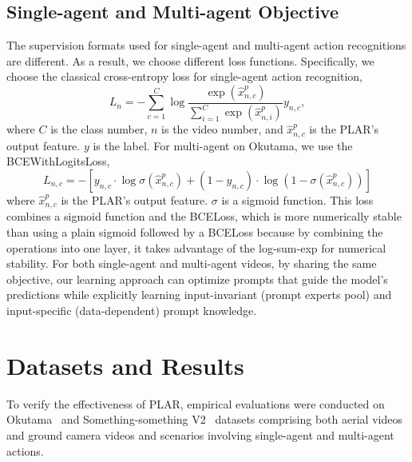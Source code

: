 \documentclass[letterpaper, 10 pt, conference]{ieeeconf}
\begin{document}
\subsection{Single-agent and Multi-agent Objective}
 The supervision formats used for single-agent and multi-agent action recognitions are different. As a result, we choose different loss functions. Specifically, we choose the classical cross-entropy loss for single-agent action recognition, 
\begin{equation}
  L_n=-\sum_{c=1}^C \log \frac{\exp \left(\hat{x}_{n, c}^p\right)}{\sum_{i=1}^C \exp \left(\hat{x}_{n, i}^p\right)} y_{n, c},  
\end{equation}
where $C$ is the class number, $n$ is the video number,  and $\hat{x}_{n, c}^p$ is the PLAR's output feature. $y$ is the label. For multi-agent on Okutama, we use the BCEWithLogitsLoss,
\begin{equation}
    L_{n, c}=-\left[ y_{n, c} \cdot \log \sigma\left(\hat{x}_{n, c}^p\right)+\left(1-y_{n, c}\right) \cdot \log \left(1-\sigma\left(\hat{x}_{n, c}^p\right)\right)\right]
\end{equation}
where $\hat{x}_{n, c}^p$ is the PLAR's output feature. $\sigma$ is a sigmoid function. This loss combines a sigmoid function and the BCELoss, which is more numerically stable than using a plain sigmoid followed by a BCELoss because by combining the operations into one layer, it takes advantage of the log-sum-exp for numerical stability. For both single-agent and multi-agent videos, by sharing the same objective, our learning approach can optimize prompts that guide the model's predictions while explicitly learning input-invariant (prompt experts pool) and input-specific (data-dependent) prompt knowledge. 

 \section{Datasets and Results}
To verify the effectiveness of PLAR, empirical evaluations were conducted on Okutama~\cite{barekatain2017okutama} and Something-something V2~\cite{goyal2017something} datasets comprising both aerial videos and ground camera videos and scenarios involving single-agent and multi-agent actions.
\end{document}
